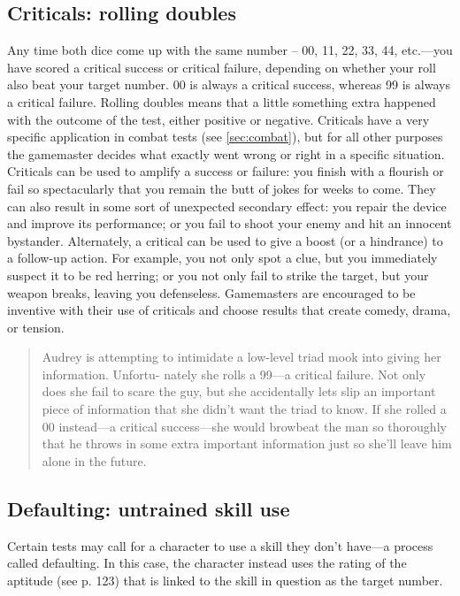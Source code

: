 \subsection{Criticals: rolling doubles}
\label{sec:crit-roll-doubl}

Any time both dice come up with the same number -- 00, 11, 22, 33, 44, etc.—you have scored a critical success or critical failure, depending on whether your roll also beat your target number. 00 is always a critical success, whereas 99 is always a critical failure. Rolling doubles means that a little something extra happened with the outcome of the test, either positive or negative. Criticals have a very specific application in combat tests (see \ref{sec:combat}), but for all other purposes the gamemaster decides what exactly went wrong or right in a specific situation. Criticals can be used to amplify a success or failure: you finish with a flourish or fail so spectacularly that you remain the butt of jokes for weeks to come. They can also result in some sort of unexpected secondary effect: you repair the device and improve its performance; or you fail to shoot your enemy and hit an innocent bystander. Alternately, a critical can be used to give a boost (or a hindrance) to a follow-up action. For example, you not only spot a clue, but you immediately suspect it to be red herring; or you not only fail to strike the target, but your weapon breaks, leaving you defenseless. Gamemasters are encouraged to be inventive with their use of criticals and choose results that create comedy, drama, or tension.

\begin{quotation}
Audrey is attempting to intimidate a low-level triad mook into giving her information. Unfortu- nately she rolls a 99—a critical failure. Not only does she fail to scare the guy, but she accidentally lets slip an important piece of information that she didn't want the triad to know. If she rolled a 00 instead—a critical success—she would browbeat the man so thoroughly that he throws in some extra important information just so she'll leave him alone in the future.
\end{quotation}

\subsection{Defaulting: untrained skill use}
\label{sec:defa-untr-skill}

Certain tests may call for a character to use a skill they don't have—a process called defaulting. In this case, the character instead uses the rating of the aptitude (see p. 123) that is linked to the skill in question as the target number.

